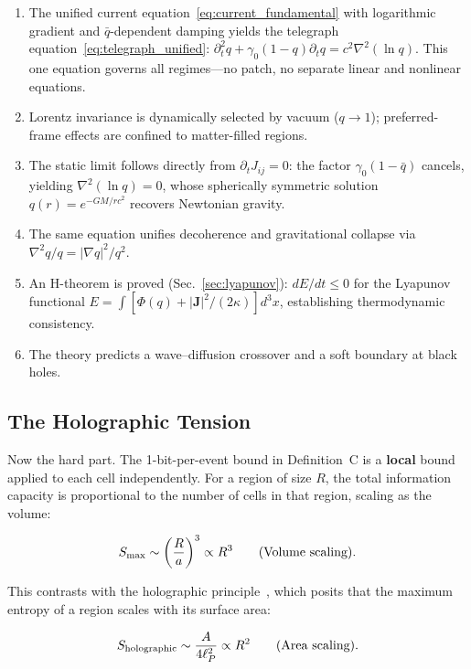\documentclass[aps,prd,twocolumn,showpacs,superscriptaddress,preprintnumbers]{revtex4-2}
\begin{document}
\begin{enumerate}
    \item The unified current equation~\eqref{eq:current_fundamental} with logarithmic gradient and $\bar{q}$-dependent damping yields the telegraph equation~\eqref{eq:telegraph_unified}: $\partial_t^2 q + \gamma_0(1-q)\partial_t q = c^2\nabla^2(\ln q)$. This one equation governs all regimes---no patch, no separate linear and nonlinear equations.
    \item Lorentz invariance is dynamically selected by vacuum ($q\to1$); preferred-frame effects are confined to matter-filled regions.
    \item The static limit follows directly from $\partial_t J_{ij}=0$: the factor $\gamma_0(1-\bar{q})$ cancels, yielding $\nabla^2(\ln q)=0$, whose spherically symmetric solution $q(r)=e^{-GM/rc^2}$ recovers Newtonian gravity.
    \item The same equation unifies decoherence and gravitational collapse via $\nabla^2 q/q = |\nabla q|^2/q^2$.
    \item An H-theorem is proved (Sec.~\ref{sec:lyapunov}): $dE/dt\leq0$ for the Lyapunov functional $E=\int[\Phi(q)+|\mathbf{J}|^2/(2\kappa)]d^3x$, establishing thermodynamic consistency.
    \item The theory predicts a wave--diffusion crossover and a soft boundary at black holes.
\end{enumerate}

\subsection{The Holographic Tension}
\label{sec:holographic}

Now the hard part.
The 1-bit-per-event bound in Definition~C is a \textbf{local} bound applied to each cell independently.
For a region of size $R$, the total information capacity is proportional to the number of cells in that region, scaling as the volume:

\begin{equation}
S_{\rm max} \sim \left(\frac{R}{a}\right)^3 \propto R^3 \qquad \text{(Volume scaling)}.
\label{eq:volume_scaling}
\end{equation}

This contrasts with the holographic principle~\cite{tHooft:1993,Susskind:1994vu}, which posits that the maximum entropy of a region scales with its surface area:

\begin{equation}
S_{\rm holographic} \sim \frac{A}{4\ell_P^2} \propto R^2 \qquad \text{(Area scaling)}.
\label{eq:area_scaling}
\end{equation}
\end{document}
